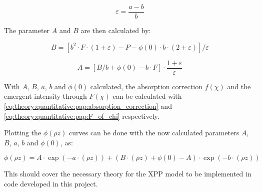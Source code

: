 \begin{equation}
    \label{eq:theory:quantitative:pap:epsilon}
    \varepsilon = \frac{a-b}{b}
\end{equation}



The parameter $A$ and $B$ are then calculated by:

\begin{equation}
    \label{eq:theory:quantitative:pap:big_B}
    B = [b^2 \cdot F \cdot (1 + \varepsilon) - P - \phi(0) \cdot b \cdot (2+\varepsilon) ] / \varepsilon
\end{equation}

\begin{equation}
    \label{eq:theory:quantitative:pap:big_A}
    A = [B/b + \phi(0) - b \cdot F] \cdot \frac{1+ \varepsilon}{\varepsilon}
\end{equation}


With $A$, $B$, $a$, $b$ and $\phi(0)$ calculated, the absorption correction $f(\chi)$ and the emergent intensity through $F(\chi)$ can be calculated with \cref{eq:theory:quantitative:pap:absorption_correction} and \cref{eq:theory:quantitative:pap:F_of_chi} respectively.

Plotting the $\phi(\rho z)$ curves can be done with the now calculated parameters $A$, $B$, $a$, $b$ and $\phi(0)$, as:

\begin{equation}
    \label{eq:theory:quantitative:pap:phi_of_rho_z}
    \phi (\rho z) = A \cdot \exp(- a \cdot (\rho z)) + (B \cdot (\rho z) + \phi(0) - A) \cdot \exp(- b \cdot (\rho z))
\end{equation}


This should cover the necessary theory for the XPP model to be implemented in code developed in this project.








